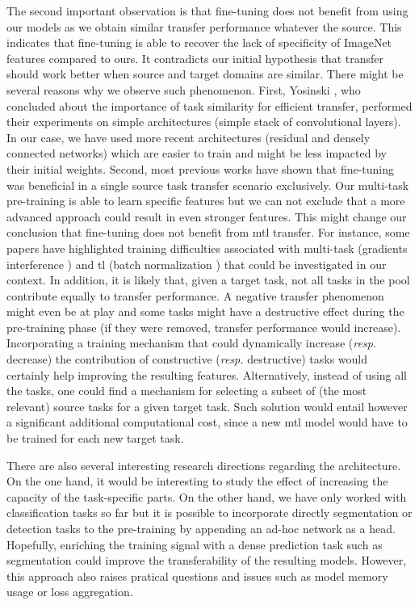 The second important observation is that fine-tuning does not benefit from using our models as we obtain similar transfer performance whatever the source. This indicates that fine-tuning is able to recover the lack of specificity of ImageNet features compared to ours. It contradicts our initial hypothesis that transfer should work better when source and target domains are similar. There might be several reasons why we observe such phenomenon. First, Yosinski \etal \cite{yosinski2014transferable}, who concluded about the importance of task similarity for efficient transfer, performed their experiments on simple architectures (\eg simple stack of convolutional layers). In our case, we have used more recent architectures (\ie residual and densely connected networks) which are easier to train and might be less impacted by their initial weights. Second, most previous works have shown that fine-tuning was beneficial in a single source task transfer scenario exclusively. Our multi-task pre-training is able to learn specific features but we can not exclude that a more advanced approach could result in even stronger features. This might change our conclusion that fine-tuning does not benefit from \acrshort{mtl} transfer. For instance, some papers have highlighted training difficulties associated with multi-task (\eg gradients interference \cite{yu2020gradient}) and \acrlong{tl} (\eg batch normalization \cite{chang2019domain}) that could be investigated in our context. In addition, it is likely that, given a target task, not all tasks in the pool contribute equally to transfer performance. A negative transfer phenomenon might even be at play and some tasks might have a destructive effect during the pre-training phase (\ie if they were removed, transfer performance would increase). Incorporating a training mechanism that could dynamically increase (\textit{resp.} decrease) the contribution of constructive (\textit{resp.} destructive) tasks would certainly help improving the resulting features. Alternatively, instead of using all the tasks, one could find a mechanism for selecting a subset of (the most relevant) source tasks for a given target task. Such solution would entail however a significant additional computational cost, since a new \acrshort{mtl} model would have to be trained for each new target task.

There are also several interesting research directions regarding the architecture. On the one hand, it would be interesting to study the effect of increasing the capacity of the task-specific parts. On the other hand, we have only worked with classification tasks so far but it is possible to incorporate directly segmentation or detection tasks to the pre-training by appending an ad-hoc network as a head. Hopefully, enriching the training signal with a dense prediction task such as segmentation could improve the transferability of the resulting models. However, this approach also raises pratical questions and issues such as model memory usage or loss aggregation. 

